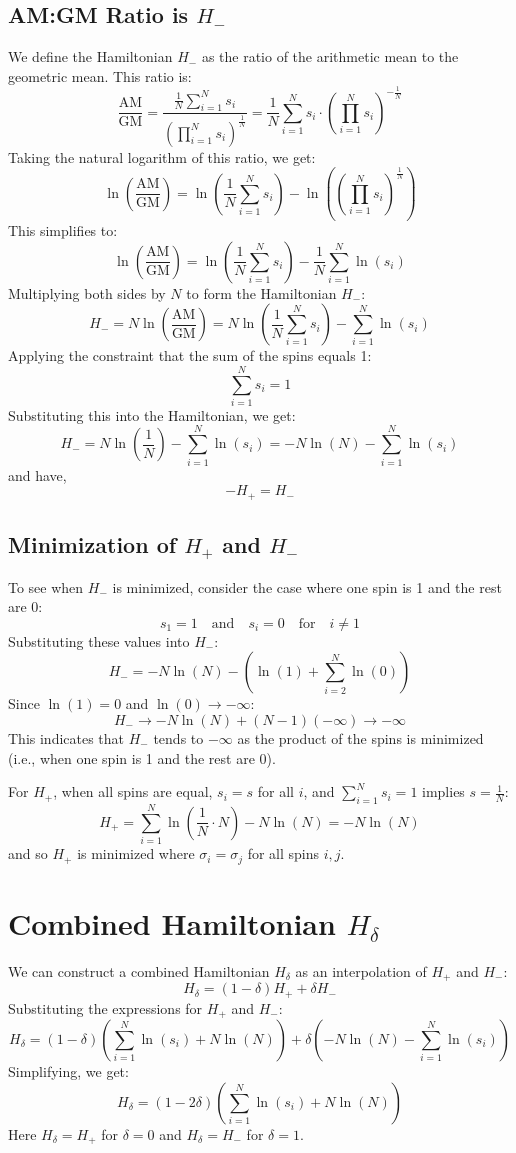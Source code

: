 \documentclass{article}
\begin{document}
\subsection{AM:GM Ratio is \(H_-\)}
We define the Hamiltonian \( H_- \) as the ratio of the arithmetic mean to the geometric mean. This ratio is:
\[
\frac{\text{AM}}{\text{GM}} = \frac{\frac{1}{N} \sum_{i=1}^N s_i}{\left( \prod_{i=1}^N s_i \right)^{\frac{1}{N}}} = \frac{1}{N} \sum_{i=1}^N s_i \cdot \left( \prod_{i=1}^N s_i \right)^{-\frac{1}{N}}
\]
Taking the natural logarithm of this ratio, we get:
\[
\ln\left( \frac{\text{AM}}{\text{GM}} \right) = \ln\left( \frac{1}{N} \sum_{i=1}^N s_i \right) - \ln\left( \left( \prod_{i=1}^N s_i \right)^{\frac{1}{N}} \right)
\]
This simplifies to:
\[
\ln\left( \frac{\text{AM}}{\text{GM}} \right) = \ln\left( \frac{1}{N} \sum_{i=1}^N s_i \right) - \frac{1}{N} \sum_{i=1}^N \ln(s_i)
\]
Multiplying both sides by \( N \) to form the Hamiltonian \( H_- \):
\[
H_- = N \ln\left( \frac{\text{AM}}{\text{GM}} \right) = N \ln\left( \frac{1}{N} \sum_{i=1}^N s_i \right) - \sum_{i=1}^N \ln(s_i)
\]
Applying the constraint that the sum of the spins equals 1:
\[
\sum_{i=1}^N s_i = 1
\]
Substituting this into the Hamiltonian, we get:
\[
H_- = N \ln\left( \frac{1}{N} \right) - \sum_{i=1}^N \ln(s_i) = -N \ln(N) - \sum_{i=1}^N \ln(s_i)
\]
and have,
\[- H_+ = H_-\]

\subsection{Minimization of \( H_+\) and \(H_- \)}
To see when \( H_- \) is minimized, consider the case where one spin is 1 and the rest are 0:
\[
s_1 = 1 \quad \text{and} \quad s_i = 0 \quad \text{for} \quad i \neq 1
\]
Substituting these values into \( H_- \):
\[
H_- = -N \ln(N) - \left( \ln(1) + \sum_{i=2}^N \ln(0) \right)
\]
Since \(\ln(1) = 0\) and \(\ln(0) \to -\infty\):
\[
H_- \to -N \ln(N) + (N-1)(-\infty) \to -\infty
\]
This indicates that \( H_- \) tends to \(-\infty\) as the product of the spins is minimized (i.e., when one spin is 1 and the rest are 0).

For \( H_+ \), when all spins are equal, \( s_i = s \) for all \( i \), and \( \sum_{i=1}^N s_i = 1 \) implies \( s = \frac{1}{N} \):
\[
H_+ = \sum_{i=1}^N \ln\left(\frac{1}{N} \cdot N\right) - N \ln(N) = - N \ln(N)
\]
and so \( H_+ \) is minimized where \(\sigma_i = \sigma_j\) for all spins \(i,j\).

\section{Combined Hamiltonian \(H_\delta\)}
We can construct a combined Hamiltonian \( H_\delta \) as an interpolation of \( H_+ \) and \( H_- \):
\[
H_\delta = (1 - \delta) H_+ + \delta H_-
\]
Substituting the expressions for \( H_+ \) and \( H_- \):
\[
H_\delta = (1 - \delta) \left( \sum_{i=1}^N \ln(s_i) + N \ln(N) \right) + \delta \left( -N \ln(N) - \sum_{i=1}^N \ln(s_i) \right)
\]
Simplifying, we get:
\[
H_\delta = (1 - 2\delta) \left( \sum_{i=1}^N \ln(s_i) + N \ln(N) \right)
\]
Here \( H_\delta = H_+ \) for \(\delta = 0\) and \(H_\delta = H_- \) for \(\delta = 1\).
\end{document}

